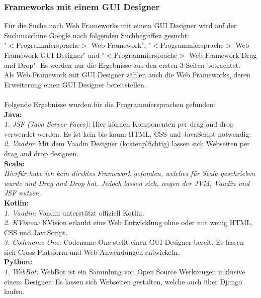\documentclass[ngerman]{article}
\begin{document}
    \subsubsection{Frameworks mit einem GUI Designer}
    \label{GrundlagenWebFrameworksWithGUIDesigner}
    Für die Suche nach Web Frameworks mit einem GUI Designer wird auf der Suchmaschine Google nach folgenden Suchbegriffen gesucht:\\
    "$<$Programmiersprache$>$ Web Framework", "$<$Programmiersprache$>$ Web Framework GUI Designer" und "$<$Programmiersprache$>$ Web Framework Drag and Drop". Es werden nur die Ergebnisse aus den ersten 3 Seiten betrachtet.\\
    Als Web Framework mit GUI Designer zählen auch die Web Frameworks, deren Erweiterung einen GUI Designer bereitstellen.\\\\
    Folgende Ergebnisse wurden für die Programmiersprachen gefunden:\\
    \textbf{Java:}\\
    \textit{1. JSF (Java Server Faces)}: Hier können Komponenten per drag and drop verwendet werden. Es ist kein bis kaum HTML, CSS und JavaScript notwendig. \cite{JavaWebFramework1}\\
    \textit{2. Vaadin}: Mit dem Vaadin Designer (kostenplfichtig) lassen sich Webseiten per drag and drop designen. \cite{JavaVaadinDesigner}\\
    \textbf{Scala:}\\
    \textit{Hierfür habe ich kein direktes Framework gefunden, welches für Scala geschrieben wurde und Drag and Drop hat. Jedoch lassen sich, wegen der JVM, Vaadin und JSF nutzen.}\\
    \textbf{Kotlin:}\\
    \textit{1. Vaadin:} Vaadin unterstützt offiziell Kotlin. \cite{KotlinVaadin}\\
    \textit{2. KVision:} KVision erlaubt eine Web Entwicklung ohne oder mit wenig HTML, CSS und JavaScript. \cite{Kotlin KVision}\\
    \textit{3. Codename One:} Codename One stellt einen GUI Designer bereit. Es lassen sich Cross Plattform und Web Anwendungen entwickeln. \cite{Kotlin Codename One}\\
    \textbf{Python:}\\
    \textit{1. WebBot:} WebBot ist ein Sammlung von Open Source Werkzeugen inklusive einem Designer. Es lassen sich Webseiten gestalten, welche auch über Django laufen. \cite{Python Webbot}\\
\end{document}
